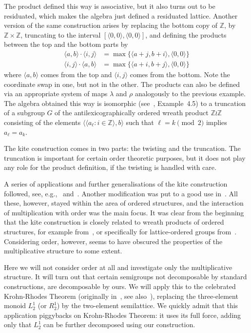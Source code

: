 \documentclass{amsart}
\begin{document}
The product defined this way is associative, but it also turns out to be
residuated, which makes the 
algebra just defined a residuated lattice. Another version of the same
construction arises by replacing the bottom copy of $\mathbb{Z}$, by
$\mathbb{Z}\times\mathbb{Z}$, truncating to the interval
$[\langle 0,0\rangle, \langle 0,0\rangle]$, and defining the products 
between the top and the bottom parts by
\begin{align*}
  \langle a,b\rangle\cdot \langle i,j\rangle  &=
      \max\{\langle a+j,b+i\rangle,\langle 0,0\rangle\}\\
  \langle i,j\rangle\cdot\langle a,b\rangle &=
      \max\{\langle a+i,b+j\rangle,\langle 0,0\rangle\}
\end{align*}
where $\langle a,b\rangle$ comes from the top and 
$\langle i,j\rangle$ comes from the bottom. Note the coordinate swap in one, but
not in the other. The products can also be defined via an appropriate system of maps
$\lambda$ and $\rho$ analogously to the previous example. The algebra obtained this way is
isomorphic (see~\cite{DK14}, Example~4.5) to a truncation of a subgroup $G$ of the
antilexicographically ordered wreath product $\mathbb{Z}\wr\mathbb{Z}$
consisting of the elements  $\langle\langle a_\ell : i\in\mathbb{Z}\rangle,
b\rangle$ such that $\ell = k \pmod 2$ implies $a_\ell = a_k$. 

The kite construction comes in two parts: the twisting and the truncation. The
truncation is important for certain order theoretic purposes, but it does not
play any role for the product definition, if the twisting is handled with care.


A series of applications and further
generalisations of the kite construction followed, see, e.g.,~\cite{DH14}
and~\cite{BD15}. 
Another modification was put to a good use in~\cite{BKLT16}. All these, however,
stayed within the area of ordered structures, and the interaction of
multiplication with order was the main focus. It was clear from the beginning
that the kite construction is closely related to wreath products of 
ordered structures, for example from~\cite{JT04}, or specifically for
lattice-ordered groups from~\cite{HMC69}. 
Considering order, however, seems
to have obscured the properties of the multiplicative structure to some extent.

Here we will not consider order at all and investigate only the multiplicative
structure. It will turn out that certain semigroups not decomposable by
standard constructions, are decomposable by ours. We will apply this 
to the celebrated Krohn-Rhodes Theorem (originally in~\cite{KR62}, see
also~\cite{RS09}), replacing the three-element monoid $L_2^1$ (or
$R_2^1$) by the two-element semilattice. We quickly admit that this application
piggybacks on Krohn-Rhodes Theorem: it uses its full force, adding only that
$L_2^1$ can be further decomposed using our construction.
\end{document}
